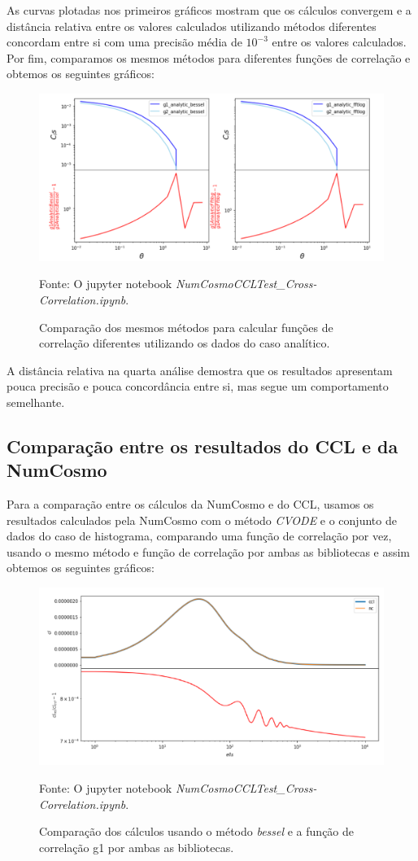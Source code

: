 As curvas plotadas nos primeiros gráficos mostram que os cálculos convergem e a distância relativa entre os valores calculados utilizando métodos diferentes concordam entre si com uma precisão média de $ 10^{-3} $ entre os valores calculados. Por fim, comparamos os mesmos métodos para diferentes funções de correlação e obtemos os seguintes gráficos:

\begin{figure}[H]
	\centering
	\caption{Comparação dos mesmos métodos para calcular funções de correlação diferentes utilizando os dados do caso analítico.}
	\includegraphics[width=0.7\linewidth]{"figuras/fig4"}
	
	\label{fig:fig4}
	
	Fonte: O jupyter notebook \textit{NumCosmoCCLTest\_Cross-Correlation.ipynb}.
\end{figure}

A distância relativa na quarta análise demostra que os resultados apresentam pouca precisão e pouca concordância entre si, mas segue um comportamento semelhante.

\subsection*{Comparação entre os resultados do CCL e da NumCosmo}

Para a comparação entre os cálculos da NumCosmo e do CCL, usamos os resultados calculados pela NumCosmo com o método \textit{CVODE} e o conjunto de dados do caso de histograma, comparando uma função de correlação por vez, usando o mesmo método e função de correlação por ambas as bibliotecas e assim obtemos os seguintes gráficos: 

\begin{figure}[H]
	\centering
	\caption{Comparação dos cálculos usando o método \textit{bessel} e a função de correlação g1 por ambas as bibliotecas.}
	\includegraphics[width=0.7\linewidth]{"figuras/fig5"}	
	\label{fig:fig5}
	
	Fonte: O jupyter notebook \textit{NumCosmoCCLTest\_Cross-Correlation.ipynb}.
\end{figure}

